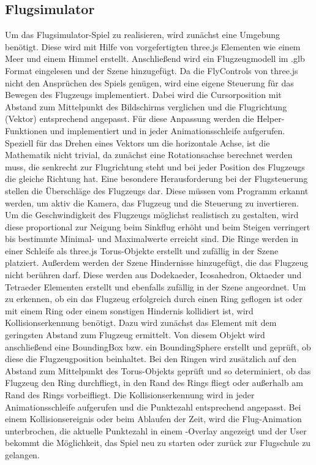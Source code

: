 \subsection{Flugsimulator}

Um das Flugsimulator-Spiel zu realisieren, wird zunächst eine Umgebung benötigt.
Diese wird mit Hilfe von vorgefertigten three.js Elementen wie einem Meer und einem Himmel erstellt.
Anschließend wird ein Flugzeugmodell im .glb Format eingelesen und der Szene hinzugefügt.
\newparagraph
Da die FlyControls von three.js nicht den Ansprüchen des Spiels genügen, wird eine eigene Steuerung für das Bewegen des Flugzeugs implementiert.
Dabei wird die Cursorposition mit Abstand zum Mittelpunkt des Bildschirms verglichen und die Flugrichtung (Vektor) entsprechend angepasst.
Für diese Anpassung werden die Helper-Funktionen  und  implementiert und in jeder Animationsschleife aufgerufen.
Speziell für das Drehen eines Vektors um die horizontale Achse, ist die Mathematik nicht trivial, da zunächst eine Rotationsachse berechnet werden muss, die senkrecht zur Flugrichtung steht und bei jeder Position des Flugzeugs die gleiche Richtung hat.
Eine besondere Herausforderung bei der Flugsteuerung stellen die Überschläge des Flugzeugs dar.
Diese müssen vom Programm erkannt werden, um aktiv die Kamera, das Flugzeug und die Steuerung zu invertieren.
Um die Geschwindigkeit des Flugzeugs möglichst realistisch zu gestalten, wird diese proportional zur Neigung beim Sinkflug erhöht und beim Steigen verringert bis bestimmte Minimal- und Maximalwerte erreicht sind.
\newparagraph
Die Ringe werden in einer Schleife als three.js Torus-Objekte erstellt und zufällig in der Szene platziert.
Außerdem werden der Szene Hindernisse hinzugefügt, die das Flugzeug nicht berühren darf.
Diese werden aus Dodekaeder, Icosahedron, Oktaeder und Tetraeder Elementen erstellt und ebenfalls zufällig in der Szene angeordnet.
\newparagraph
Um zu erkennen, ob ein das Flugzeug erfolgreich durch einen Ring geflogen ist oder mit einem Ring oder einem sonstigen Hindernis kollidiert ist, wird Kollisionserkennung benötigt.
Dazu wird zunächst das Element mit dem geringsten Abstand zum Flugzeug ermittelt.
Von diesem Objekt wird anschließend eine BoundingBox bzw. ein BoundingSphere erstellt und geprüft, ob diese die Flugzeugposition beinhaltet.
Bei den Ringen wird zusätzlich auf den Abstand zum Mittelpunkt des Torus-Objekts geprüft und so determiniert, ob das Flugzeug den Ring durchfliegt, in den Rand des Rings fliegt oder außerhalb am Rand des Rings vorbeifliegt.
Die Kollisionserkennung wird in jeder Animationsschleife aufgerufen und die Punktezahl entsprechend angepasst.
Bei einem Kollisionsereignis oder beim Ablaufen der Zeit, wird die Flug-Animation unterbrochen, die aktuelle Punktezahl in einem -Overlay angezeigt und der User bekommt die Möglichkeit, das Spiel neu zu starten oder zurück zur Flugschule zu gelangen.